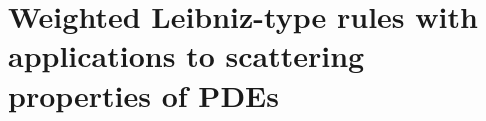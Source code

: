 \cleardoublepage

\chapter{Weighted Leibniz-type rules with applications to scattering properties of PDEs}\label{chapter2}

